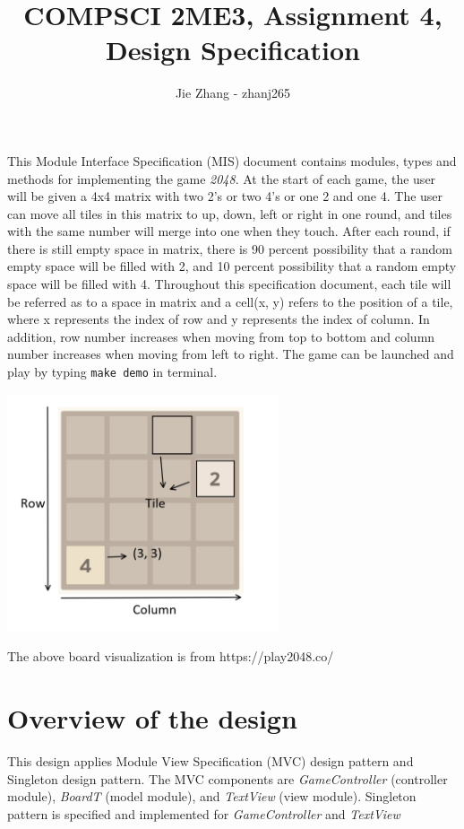 \documentclass[12pt]{article}
\title{COMPSCI 2ME3, Assignment 4, Design Specification}
\author{Jie Zhang - zhanj265}
\begin{document}
\maketitle
This Module Interface Specification (MIS) document contains modules, types and
methods for implementing the game \textit{2048}. At the start of each game, the user will be given a 4x4 matrix with two 2's or two 4's or one 2 and one 4. The user can move all tiles in this matrix to up, down, left or right in one round, and tiles with the same number will merge into one when they touch. After each round, if there is still empty space in matrix, there is 90 percent possibility that a random empty space will be filled with 2, and 10 percent possibility that a random empty space will be filled with 4. Throughout this specification document, each tile will be referred as to a space in matrix and a cell(x, y) refers to the position of a tile, where x represents the index of row and y represents the index of column. In addition, row number increases when moving from top to bottom and column number increases when moving from left to right. The game can be launched and play by typing \texttt{make demo} in terminal.


\begin{center}
  \includegraphics[width=0.6\textwidth]{Game_begin.png}

  The above board visualization is from https://play2048.co/
\end{center}

\newpage

\section{Overview of the design}

This design applies Module View Specification (MVC) design pattern and Singleton design pattern. The MVC components are \textit{GameController} (controller module), \textit{BoardT} (model module), and \textit{TextView} (view module). Singleton pattern is specified and implemented for \textit{GameController} and \textit{TextView}
\end{document}
